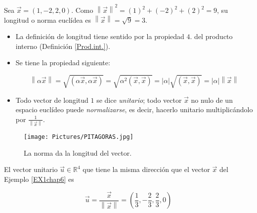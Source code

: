 \bigskip

\begin{example}
\label{EX1chap6}
 Sea $\vec{x}=(1,-2,2,0)$. Como $\left\| \vec{x}\right\|^2=(1)^2+(-2)^2+(2)^2=9$,
su longitud o norma euclídea  es $\left\| \vec{x}\right\|=\sqrt{9}=3.$   
\end{example}

\bigskip


\begin{remark}
    \begin{itemize}
\item

La definición de longitud   tiene sentido por la propiedad $4.$ del producto interno (Definición  \ref{Prod.int.}).


\item

Se tiene  la propiedad siguiente:

$$\left\|\alpha \vec{x}\right\|= \sqrt{(\alpha\vec{x},\alpha\vec{x})}=\sqrt{\alpha^{2}(\vec{x},\vec{x})}=\left|\alpha\right|\sqrt{(\vec{x},\vec{x})}=\left|\alpha\right|\left\|\vec{x}\right\|$$


\item
Todo vector de longitud $1$ se dice \textit{unitario}; todo vector $\vec{x}$ no nulo de un espacio euclídeo puede \textit{normalizarse}, es decir, hacerlo unitario multiplicándolo por $\frac {1}{\left\|\vec{x}\right\|}$.
\end{itemize}
\end{remark}





\begin{figure}
    \centering
    \texttt{[image: Pictures/PITAGORAS.jpg]}
    \caption{La norma da la longitud del vector.}
    \label{PITAGORAS}
\end{figure}

\bigskip

\begin{example}
    

El vector unitario $\vec{u} \in \mathbb{R}^4$ que tiene la misma dirección que el vector $\vec{x}$ del Ejemplo \ref{EX1chap6} es



\begin{equation}
\vec{u}=\frac{\vec{x}}{\left\| \vec{x} \right\|}=(\frac{1}{3}, -\frac{2}{3}, \frac{2}{3},0)
 \label{20}
\end{equation}
\end{example}  

